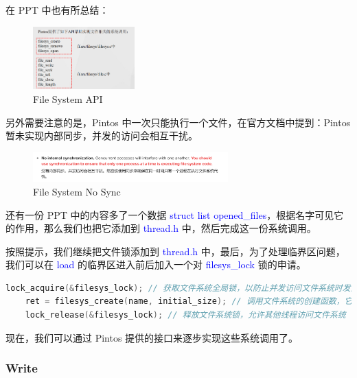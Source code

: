 \documentclass[14pt,a4paper,UTF8,twoside]{article}
\renewcommand{\texttt}[1]{\textcolor{blue}{\ttfamily #1}}
\begin{document}
在 PPT 中也有所总结：

\begin{figure}[H]
    \centering
    \includegraphics[width=0.35\textwidth]{img6/apippt.png}
    \caption{File System API}
    \label{fig:fs}
\end{figure}

另外需要注意的是，Pintos 中一次只能执行一个文件，在官方文档中提到：Pintos 暂未实现内部同步，并发的访问会相互干扰。

\begin{figure}[H]
    \centering
    \includegraphics[width=0.67\textwidth]{img6/nosyn.png}
    \caption{File System No Sync}
    \label{fig:sync}
\end{figure}

还有一份 PPT 中的内容多了一个数据 \texttt{struct list opened\_files}，根据名字可见它的作用，那么我们也把它添加到 \texttt{thread.h} 中，然后完成这一份系统调用。

按照提示，我们继续把文件锁添加到 \texttt{thread.h} 中，最后，为了处理临界区问题，我们可以在 \texttt{load} 的临界区进入前后加入一个对 \texttt{filesys\_lock} 锁的申请。

\begin{lstlisting}[language=C]
    lock_acquire(&filesys_lock); // 获取文件系统全局锁，以防止并发访问文件系统时发生数据竞争
    ret = filesys_create(name, initial_size); // 调用文件系统的创建函数，它的返回值为 bool
    lock_release(&filesys_lock); // 释放文件系统锁，允许其他线程访问文件系统
\end{lstlisting}

现在，我们可以通过 Pintos 提供的接口来逐步实现这些系统调用了。

\subsubsection{Write}
\end{document}
